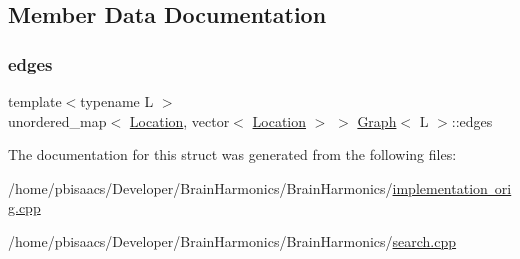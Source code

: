 \subsection{Member Data Documentation}
\mbox{\label{structGraph_a8b01818e086835dc5d24ec4082afeef0}} 
\subsubsection{\texorpdfstring{edges}{edges}}
{\footnotesize\ttfamily template$<$typename L $>$ \\
unordered\+\_\+map$<$ \mbox{\hyperlink{structGraph_aea7d42bb67163fe692353674435a1426}{Location}}, vector$<$ \mbox{\hyperlink{structGraph_aea7d42bb67163fe692353674435a1426}{Location}} $>$ $>$ \mbox{\hyperlink{structGraph}{Graph}}$<$ L $>$\+::edges}



The documentation for this struct was generated from the following files\+:\begin{DoxyCompactItemize}
\item 
/home/pbisaacs/\+Developer/\+Brain\+Harmonics/\+Brain\+Harmonics/\mbox{\hyperlink{implementation_01orig_8cpp}{implementation orig.\+cpp}}\item 
/home/pbisaacs/\+Developer/\+Brain\+Harmonics/\+Brain\+Harmonics/\mbox{\hyperlink{search_8cpp}{search.\+cpp}}\end{DoxyCompactItemize}
